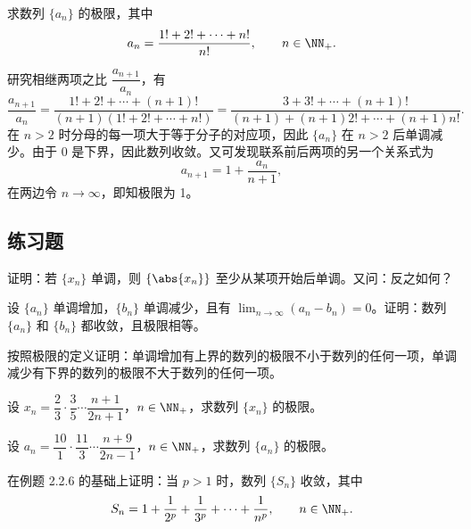 \begin{xexample}[2.3.6]
求数列 $\{a_n\}$ 的极限，其中
\[
  a_n=\frac{1!+2!+\cdots+n!}{n!},\qquad n\in\NN_+.
\]
\end{xexample}
\begin{xsolution}
研究相继两项之比 $\dfrac{a_{n+1}}{a_n}$，有
\[
  \frac{a_{n+1}}{a_n}
  =\frac{1!+2!+\cdots+(n+1)!}{(n+1)(1!+2!+\cdots+n!)}
  =\frac{3+3!+\cdots+(n+1)!}{(n+1)+(n+1)2!+\cdots+(n+1)n!}.
\]
在 $n>2$ 时分母的每一项大于等于分子的对应项，因此 $\{a_n\}$ 在 $n>2$ 后单调减少。由于 0 是下界，因此数列收敛。又可发现联系前后两项的另一个关系式为
\[
  a_{n+1}=1+\frac{a_n}{n+1},
\]
在两边令 $n\to\infty$，即知极限为 1。
\end{xsolution}

\subsection{练习题}

\begin{xexercise}[1]
证明：若 $\{x_n\}$ 单调，则 $\{\abs{x_n}\}$ 至少从某项开始后单调。又问：反之如何？
\end{xexercise}

\begin{xexercise}[2]
设 $\{a_n\}$ 单调增加，$\{b_n\}$ 单调减少，且有 $\displaystyle\lim_{n\to\infty}(a_n-b_n)=0$。证明：数列 $\{a_n\}$ 和 $\{b_n\}$ 都收敛，且极限相等。
\end{xexercise}

\begin{xexercise}[3]
按照极限的定义证明：单调增加有上界的数列的极限不小于数列的任何一项，单调减少有下界的数列的极限不大于数列的任何一项。
\end{xexercise}

\begin{xexercise}[4]
设 $x_n=\dfrac23\cdot\dfrac35\cdots\dfrac{n+1}{2n+1}$，$n\in\NN_+$，求数列 $\{x_n\}$ 的极限。
\end{xexercise}

\begin{xexercise}[5]
设 $a_n=\dfrac{10}{1}\cdot\dfrac{11}{3}\cdots\dfrac{n+9}{2n-1}$，$n\in\NN_+$，求数列 $\{a_n\}$ 的极限。
\end{xexercise}

\begin{xexercise}[6]
在例题 2.2.6 的基础上证明：当 $p>1$ 时，数列 $\{S_n\}$ 收敛，其中
  \[
    S_n=1+\frac1{2^p}+\frac1{3^p}+\cdots+\frac1{n^p},\qquad n\in\NN_+.
  \]
\end{xexercise}

